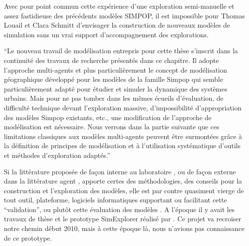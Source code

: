 Avec pour point commun cette expérience d'une exploration semi-manuelle et assez fastidieuse des précédents modèles SIMPOP, il est impossible pour Thomas Louail et Clara Schmitt d'envisager la construction de nouveaux modèles de simulation sans un vrai support d'accompagnement des explorations.

\enquote{Le nouveau travail de modélisation entrepris pour cette thèse s’inscrit dans la continuité des travaux de recherche présentés dans ce chapitre. Il adopte l’approche multi-agents et plus particulièrement le concept de modélisation géographique développé pour les modèles de la famille Simpop qui semble particulièrement adapté pour étudier et simuler la dynamique des systèmes urbains. Mais pour ne pas tomber dans les mêmes écueils d’évaluation, de difficulté technique devant l’exploration massive, d’impossibilité d’appropriation des modèles Simpop existants, etc., une modification de l’approche de modélisation est nécessaire. Nous verrons dans la partie suivante que ces limitations classiques aux modèles multi-agents peuvent être surmontées grâce à la définition de principes de modélisation et à l’utilisation systématique d’outils et méthodes d’exploration adaptés.} \autocite[113]{Schmitt2014}

Si la littérature proposée de façon interne au laboratoire \autocite{Mathian2014}, ou de façon externe dans la littérature agent \autocites{Amblard2006, Sargent2010, Gilbert2008}, apporte certes des méthodologies, des conseils pour la construction et l'exploration des modèles, elle est par contre quasiment vierge de tout outil, plateforme, logiciels informatiques supportant ou facilitant cette \enquote{validation}, ou plutôt cette évaluation des modèles \autocite{Amblard2006}. A l'époque il y avait les travaux de thèse et le prototype SimExplorer réalisé par \textcite{Amblard2003}. Ce projet va recroiser notre chemin début 2010, mais à cette époque là, nous n'avions pas connaissance de ce prototype.

